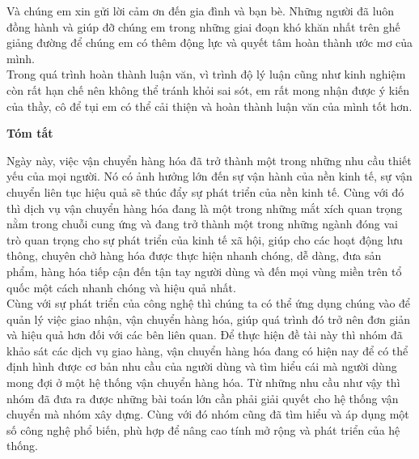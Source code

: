 	Và chúng em xin gửi lời cảm ơn đến gia đình và bạn bè. Những người đã luôn đồng hành và giúp đỡ chúng em trong những giai đoạn khó khăn nhất trên ghế giảng đường để chúng em có thêm động lực và quyết tâm hoàn thành ước mơ của mình.\\
	
	Trong quá trình hoàn thành luận văn, vì trình độ lý luận cũng như kinh nghiệm còn rất hạn chế nên không thể tránh khỏi sai sót, em rất mong nhận được ý kiến của thầy, cô để tụi em có thể cải thiện và hoàn thành luận văn của mình tốt hơn.\\

\newpage
\thispagestyle{plain}
\begin{center}
    \Large
    \textbf{Tóm tắt}
    \vspace{1cm}
\end{center}

Ngày này, việc vận chuyển hàng hóa đã trở thành một trong những nhu cầu thiết yếu của mọi người. Nó có ảnh hưởng lớn đến sự vận hành của nền kinh tế, sự vận chuyển liên tục hiệu quả sẽ thúc đẩy sự phát triển của nền kinh tế. Cùng với đó thì dịch vụ vận chuyển hàng hóa đang là một trong những mắt xích quan trọng nằm trong chuỗi cung ứng và đang trở thành một trong những ngành đóng vai trò quan trọng cho sự phát triển của kinh tế xã hội, giúp cho các hoạt động lưu thông, chuyên chở hàng hóa được thực hiện nhanh chóng, dễ dàng, đưa sản phẩm, hàng hóa tiếp cận đến tận tay người dùng và đến mọi vùng miền trên tổ quốc một cách nhanh chóng và hiệu quả nhất.\\

Cùng với sự phát triển của công nghệ thì chúng ta có thể ứng dụng chúng vào để quản lý việc giao nhận, vận chuyển hàng hóa, giúp quá trình đó trở nên đơn giản và hiệu quả hơn đối với các bên liên quan. Để thực hiện đề tài này thì nhóm đã khảo sát các dịch vụ giao hàng, vận chuyển hàng hóa đang có hiện nay để có thể định hình được cơ bản nhu cầu của người dùng và tìm hiểu cái mà người dùng mong đợi ở một hệ thống vận chuyển hàng hóa. Từ những nhu cầu như vậy thì nhóm đã đưa ra được những bài toán lớn cần phải giải quyết cho hệ thống vận chuyển mà nhóm xây dựng. Cùng với đó nhóm cũng đã tìm hiểu và áp dụng một số công nghệ phổ biến, phù hợp để nâng cao tính mở rộng và phát triển của hệ thống.\\

